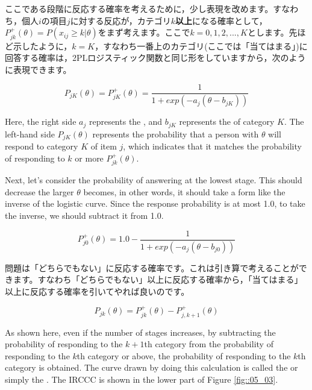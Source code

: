 \documentclass{ltjsbook}
\begin{document}
ここである段階に反応する確率を考えるために，少し表現を改めます。すなわち，個人$i$の項目$j$に対する反応が，カテゴリ$k$\textbf{以上}になる確率として，$P^{+}_{jk}(\theta) = P(x_{ij} \ge k|\theta)$をまず考えます。ここで$k=0,1,2,...,K$とします。先ほど示したように，$k=K$，すなわち一番上のカテゴリ(ここでは「当てはまる」)に回答する確率は，2PLロジスティック関数と同じ形をしていますから，次のように表現できます。

\[ P_{jK}(\theta) = P^{+}_{jK}(\theta) = \frac{1}{1+exp(-a_j(\theta-b_{jK}))} \]

Here, the right side $a_j$ represents the , and $b_{jK}$ represents the  of category $K$.
The left-hand side $P_{jK}(\theta)$ represents the probability that a person with $\theta$ will respond to category $K$ of item $j$, which indicates that it matches the probability of responding to $k$ or more $P^{+}_{jk}(\theta)$.

Next, let's consider the probability of answering at the lowest stage. This should decrease the larger $\theta$ becomes, in other words, it should take a form like the inverse of the logistic curve. Since the response probability is at most 1.0, to take the inverse, we should subtract it from 1.0.

\[ P^{+}_{j0}(\theta) = 1.0 -   \frac{1}{1+exp(-a_j(\theta-b_{j0}))} \]

問題は「どちらでもない」に反応する確率です。これは引き算で考えることができます。すなわち「どちらでもない」以上に反応する確率から，「当てはまる」以上に反応する確率を引いてやれば良いのです。

\[P_{jk}(\theta) = P^{+}_{jk}(\theta)-P^{+}_{j,k+1}(\theta) \]

As shown here, even if the number of stages increases, by subtracting the probability of responding to the $k+1$th category from the probability of responding to the $k$th category or above, the probability of responding to the $k$th category is obtained. The curve drawn by doing this calculation is called the  or simply the . The IRCCC is shown in the lower part of Figure \ref{fig::05_03}.
\end{document}
